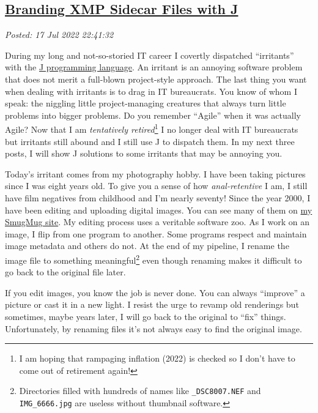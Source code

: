 %

\subsection*{\href{https://analyzethedatanotthedrivel.org/2022/07/17/branding-xmp-sidecar-files-with-j/}{Branding XMP Sidecar Files with J}}


\noindent\emph{Posted: 17 Jul 2022 22:41:32}
\vspace{6pt}

During my long and not-so-storied IT career I covertly dispatched
``irritants'' with the
\href{https://code.jsoftware.com/wiki/Main_Page}{J programming
language}. An irritant is an annoying software problem that does not
merit a full-blown project-style approach. The last thing you want when
dealing with irritants is to drag in IT bureaucrats. You know of whom I
speak: the niggling little project-managing creatures that always turn
little problems into bigger problems. Do you remember ``Agile'' when it
was actually Agile? Now that I am \emph{tentatively
retired}\footnote{I am hoping that rampaging inflation (2022) is checked so I don't have
  to come out of retirement again!} I no longer deal with IT bureaucrats but irritants still abound and I
still use J to dispatch them. In my next three posts, I will show J
solutions to some irritants that may be annoying you.

Today's irritant comes from my photography hobby. I have been taking
pictures since I was eight years old. To give you a sense of how
\emph{anal-retentive} I am, I still have film negatives from childhood and I'm nearly seventy!
Since the year 2000, I have been editing and uploading digital images.
You can see many of them on
\href{https://conceptcontrol.smugmug.com/}{my SmugMug site}. My editing
process uses a veritable software zoo. As I work on an image, I flip
from one program to another. Some programs respect and maintain image
metadata and others do not. At the end of my pipeline, I rename the
image file to something
meaningful\footnote{Directories filled with hundreds of names like \texttt{\_DSC8007.NEF} and
  \texttt{IMG\_6666.jpg} are useless without thumbnail software.} even
though renaming makes it difficult to go back to the original file
later.

If you edit images, you know the job is never done. You can always
``improve'' a picture or cast it in a new light. I resist the urge to
revamp old renderings but sometimes, maybe years later, I will go back
to the original to ``fix'' things. Unfortunately, by renaming files it's
not always easy to find the original image.

